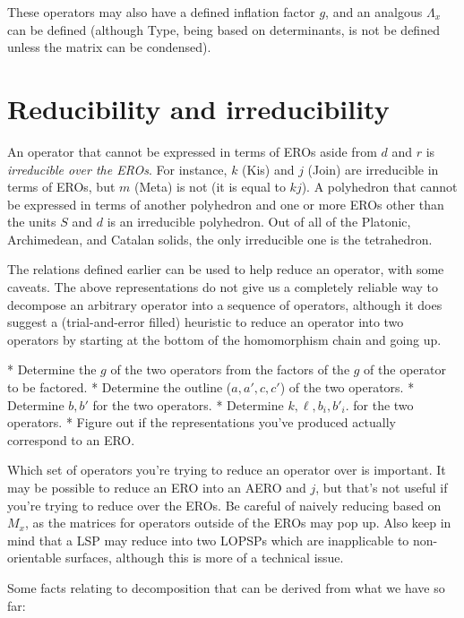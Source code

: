 \documentclass{amsart}[12pt]
\begin{document}
These operators may also have a defined inflation factor $g$, and an analgous
$\Lambda_x$ can be defined (although Type, being based on determinants, is not
be defined unless the matrix can be condensed).

\section{Reducibility and irreducibility}
An operator that cannot be expressed in terms of EROs aside from $d$ and
$r$ is \textit{irreducible over the EROs}. For instance, $k$ (Kis) and $j$
(Join) are irreducible in terms of EROs, but $m$ (Meta) is not (it is equal to
$kj$). A polyhedron that cannot be expressed in terms of another polyhedron and
one or more EROs other than the units $S$ and $d$ is an irreducible polyhedron.
Out of all of the Platonic, Archimedean, and Catalan solids, the only
irreducible one is the tetrahedron.

The relations defined earlier can be used to help reduce an operator,
with some caveats. The above representations do not give us a completely
reliable way to decompose an arbitrary operator into a sequence of operators,
although it does suggest a (trial-and-error filled) heuristic to reduce an
operator into two operators by starting at the bottom of the homomorphism chain
and going up.

* Determine the $g$ of the two operators from the factors of the
  $g$ of the operator to be factored.
* Determine the outline ($a, a', c, c'$) of the two operators.
* Determine $b, b'$ for the two operators.
* Determine $k, \ell, b_i, b'_i$. for the two operators.
* Figure out if the representations you've produced actually correspond to
  an ERO.

Which set of operators you're trying to reduce an operator over is important.
It may be possible to reduce an ERO into an AERO and $j$, but that's not useful
if you're trying to reduce over the EROs. Be careful of naively reducing based
on $M_x$, as the matrices for operators outside of the EROs may pop up. Also
keep in mind that a LSP may reduce into two LOPSPs which are inapplicable to
non-orientable surfaces, although this is more of a technical issue.

Some facts relating to decomposition that can be derived from what we have
so far:
\end{document}

